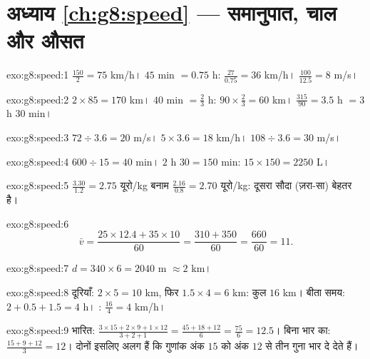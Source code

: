 \section*{अध्याय \ref{ch:g8:speed} --- समानुपात, चाल और औसत}

\begin{solution}{exo:g8:speed:1}
$\frac{150}{2} = 75$ km/h। \quad
$45$ min $= 0.75$ h: $\frac{27}{0.75} = 36$ km/h। \quad
$\frac{100}{12.5} = 8$ m/s।
\end{solution}

\begin{solution}{exo:g8:speed:2}
$2 \times 85 = 170$ km। \quad
$40$ min $= \frac23$ h: $90 \times \frac23 = 60$ km। \quad
$\frac{315}{90} = 3.5$ h $= 3$ h $30$ min।
\end{solution}

\begin{solution}{exo:g8:speed:3}
$72 \div 3.6 = 20$ m/s। \quad
$5 \times 3.6 = 18$ km/h। \quad
$108 \div 3.6 = 30$ m/s।
\end{solution}

\begin{solution}{exo:g8:speed:4}
$600 \div 15 = 40$ min। \quad
$2$ h $30 = 150$ min: $15 \times 150 = 2250$ L।
\end{solution}

\begin{solution}{exo:g8:speed:5}
$\frac{3.30}{1.2} = 2.75$ यूरो/kg बनाम
$\frac{2.16}{0.8} = 2.70$ यूरो/kg: दूसरा सौदा (ज़रा-सा) बेहतर है।
\end{solution}

\begin{solution}{exo:g8:speed:6}
\[
\bar v = \frac{25 \times 12.4 + 35 \times 10}{60}
= \frac{310 + 350}{60} = \frac{660}{60} = 11 .
\]
\end{solution}

\begin{solution}{exo:g8:speed:7}
$d = 340 \times 6 = 2040$ m $\approx 2$ km।
\end{solution}

\begin{solution}{exo:g8:speed:8}
दूरियाँ: $2 \times 5 = 10$ km, फिर $1.5 \times 4 = 6$ km: कुल
$16$ km। बीता समय: $2 + 0.5 + 1.5 = 4$ h। :
$\frac{16}{4} = 4$ km/h।
\end{solution}

\begin{solution}{exo:g8:speed:9}
भारित:
$\frac{3 \times 15 + 2 \times 9 + 1 \times 12}{3 + 2 + 1}
= \frac{45 + 18 + 12}{6} = \frac{75}{6} = 12.5$।
बिना भार का: $\frac{15 + 9 + 12}{3} = 12$। दोनों इसलिए अलग हैं कि
गुणांक अंक $15$ को अंक $12$ से तीन गुना भार दे देते हैं।
\end{solution}

